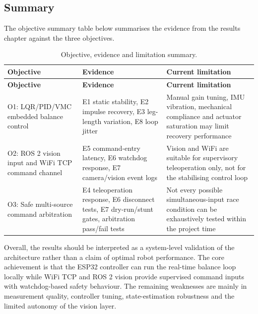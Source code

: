 \documentclass[12pt, a4paper]{article}
\begin{document}
\subsection{Summary}

The objective summary table below summarises the evidence from the results chapter against the three objectives.


\begingroup
\singlespacing
\small
\setlength{\tabcolsep}{2pt}
\renewcommand{\arraystretch}{1.15}
\begin{longtable}{>{\RaggedRight\arraybackslash}p{}>{\RaggedRight\arraybackslash}p{}>{\RaggedRight\arraybackslash}p{}}
\caption{Objective, evidence and limitation summary.}\\
\toprule
\textbf{Objective} & \textbf{Evidence} & \textbf{Current limitation} \\
\midrule
\endfirsthead
\toprule
\textbf{Objective} & \textbf{Evidence} & \textbf{Current limitation} \\
\midrule
\endhead
O1: LQR/PID/VMC embedded balance control & E1 static stability, E2 impulse recovery, E3 leg-length variation, E8 loop jitter & Manual gain tuning, IMU vibration, mechanical compliance and actuator saturation may limit recovery performance \\
O2: ROS 2 vision input and WiFi TCP command channel & E5 command-entry latency, E6 watchdog response, E7 camera/vision event logs & Vision and WiFi are suitable for supervisory teleoperation only, not for the stabilising control loop \\
O3: Safe multi-source command arbitration & E4 teleoperation response, E6 disconnect tests, E7 dry-run/stunt gates, arbitration pass/fail tests & Not every possible simultaneous-input race condition can be exhaustively tested within the project time \\
\bottomrule
\end{longtable}
\endgroup

Overall, the results should be interpreted as a system-level validation of the architecture rather than a claim of optimal robot performance. The core achievement is that the ESP32 controller can run the real-time balance loop locally while WiFi TCP and ROS 2 vision provide supervised command inputs with watchdog-based safety behaviour. The remaining weaknesses are mainly in measurement quality, controller tuning, state-estimation robustness and the limited autonomy of the vision layer.
\end{document}
